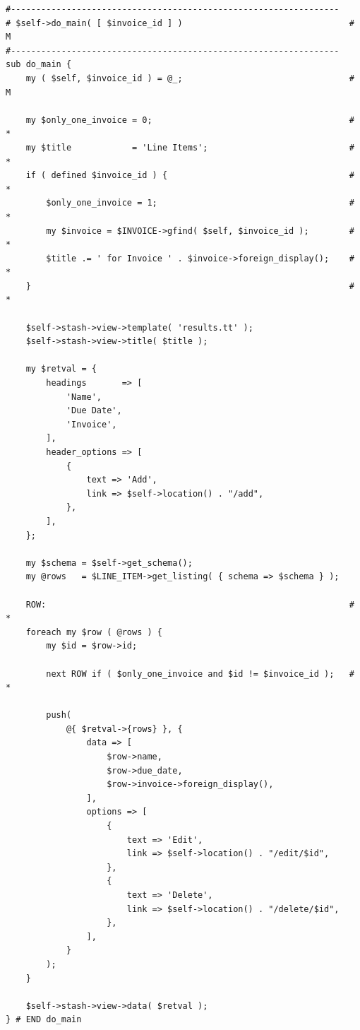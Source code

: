 \begin{verbatim}
#-----------------------------------------------------------------
# $self->do_main( [ $invoice_id ] )                                 # M
#-----------------------------------------------------------------
sub do_main {
    my ( $self, $invoice_id ) = @_;                                 # M

    my $only_one_invoice = 0;                                       # *
    my $title            = 'Line Items';                            # *
    if ( defined $invoice_id ) {                                    # *
        $only_one_invoice = 1;                                      # *
        my $invoice = $INVOICE->gfind( $self, $invoice_id );        # *
        $title .= ' for Invoice ' . $invoice->foreign_display();    # *
    }                                                               # *

    $self->stash->view->template( 'results.tt' );
    $self->stash->view->title( $title );

    my $retval = {
        headings       => [
            'Name',
            'Due Date',
            'Invoice',
        ],
        header_options => [
            {
                text => 'Add',
                link => $self->location() . "/add",
            },
        ],
    };

    my $schema = $self->get_schema();
    my @rows   = $LINE_ITEM->get_listing( { schema => $schema } );

    ROW:                                                            # *
    foreach my $row ( @rows ) {
        my $id = $row->id;

        next ROW if ( $only_one_invoice and $id != $invoice_id );   # *

        push(
            @{ $retval->{rows} }, {
                data => [
                    $row->name,
                    $row->due_date,
                    $row->invoice->foreign_display(),
                ],
                options => [
                    {
                        text => 'Edit',
                        link => $self->location() . "/edit/$id",
                    },
                    {
                        text => 'Delete',
                        link => $self->location() . "/delete/$id",
                    },
                ],
            }
        );
    }

    $self->stash->view->data( $retval );
} # END do_main
\end{verbatim}

